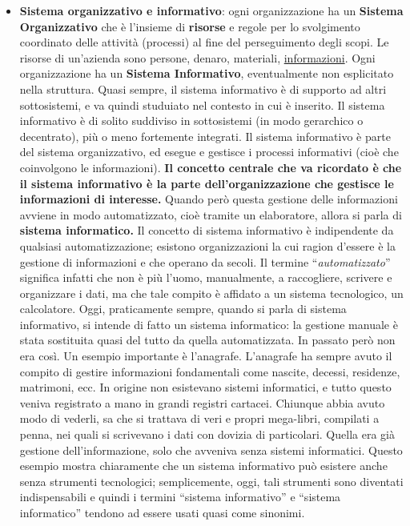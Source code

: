 \documentclass{article}
\begin{document}
\begin{itemize}
    \item \textbf{Sistema organizzativo e informativo}: ogni organizzazione ha un \textbf{Sistema Organizzativo} che è l'insieme di \textbf{risorse} e regole per lo svolgimento coordinato delle attività (processi) al fine del perseguimento degli scopi. Le risorse di un'azienda sono persone, denaro, materiali, \underline{informazioni}. Ogni organizzazione ha un \textbf{Sistema Informativo}, eventualmente non esplicitato nella struttura. Quasi sempre, il sistema informativo è di supporto ad altri sottosistemi, e va quindi studuiato nel contesto in cui è inserito. Il sistema informativo è di solito suddiviso in sottosistemi (in modo gerarchico o decentrato), più o meno fortemente integrati. Il sistema informativo è parte del sistema organizzativo, ed esegue e gestisce i processi informativi (cioè che coinvolgono le informazioni). \textbf{Il concetto centrale che va ricordato è che il sistema informativo è la parte dell'organizzazione che gestisce le informazioni di interesse.} Quando però questa gestione delle informazioni avviene in modo automatizzato, cioè tramite un elaboratore, allora si parla di \textbf{sistema informatico.} Il concetto di sistema informativo è indipendente da qualsiasi automatizzazione; esistono organizzazioni la cui ragion d'essere è la gestione di informazioni e che operano da secoli. Il termine “\textit{automatizzato}” significa infatti che non è più l'uomo, manualmente, a raccogliere, scrivere e organizzare i dati, ma che tale compito è affidato a un sistema tecnologico, un calcolatore. Oggi, praticamente sempre, quando si parla di sistema informativo, si intende di fatto un sistema informatico: la gestione manuale è stata sostituita quasi del tutto da quella automatizzata. In passato però non era così. Un esempio importante è l'anagrafe. L'anagrafe ha sempre avuto il compito di gestire informazioni fondamentali come nascite, decessi, residenze, matrimoni, ecc. In origine non esistevano sistemi informatici, e tutto questo veniva registrato a mano in grandi registri cartacei. Chiunque abbia avuto modo di vederli, sa che si trattava di veri e propri mega-libri, compilati a penna, nei quali si scrivevano i dati con dovizia di particolari. Quella era già gestione dell'informazione, solo che avveniva senza sistemi informatici. Questo esempio mostra chiaramente che un sistema informativo può esistere anche senza strumenti tecnologici; semplicemente, oggi, tali strumenti sono diventati indispensabili e quindi i termini “sistema informativo” e “sistema informatico” tendono ad essere usati quasi come sinonimi.

\end{itemize}
\end{document}
